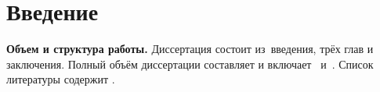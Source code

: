 \chapter*{Введение}							%

\newcommand{\actuality}{\textbf\actualityTXT}
\newcommand{\progress}{}
\newcommand{\aim}{{\textbf\aimTXT}}
\newcommand{\tasks}{\textbf{\tasksTXT}}
\newcommand{\researchsubject}{\textbf{\researchsubjectTXT}}
\newcommand{\novelty}{\textbf{\noveltyTXT}}
\newcommand{\influence}{\textbf{\influenceTXT}}
\newcommand{\methods}{\textbf{\methodsTXT}}
\newcommand{\defpositions}{\textbf{\defpositionsTXT}}
\newcommand{\reliability}{\textbf{\reliabilityTXT}}
\newcommand{\probation}{\textbf{\probationTXT}}
\newcommand{\contribution}{\textbf{\contributionTXT}}
\newcommand{\publications}{\textbf{\publicationsTXT}}


\textbf{Объем и структура работы.} Диссертация состоит из~введения, трёх глав и
заключения. Полный объём диссертации составляет
 и
включает~
и~. Список литературы содержит
.

